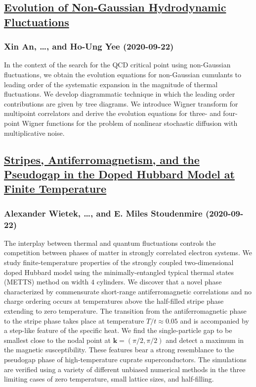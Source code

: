 {\subsection*{\href{http://arxiv.org/abs/2009.10742v1}{Evolution of Non-Gaussian Hydrodynamic Fluctuations}}
\subsubsection*{Xin An, \dots, and Ho-Ung Yee (2020-09-22)}
In the context of the search for the QCD critical point using non-Gaussian
fluctuations, we obtain the evolution equations for non-Gaussian cumulants to
leading order of the systematic expansion in the magnitude of thermal
fluctuations. We develop diagrammatic technique in which the leading order
contributions are given by tree diagrams. We introduce Wigner transform for
multipoint correlators and derive the evolution equations for three- and
four-point Wigner functions for the problem of nonlinear stochastic diffusion
with multiplicative noise.

\subsection*{\href{http://arxiv.org/abs/2009.10736v1}{Stripes, Antiferromagnetism, and the Pseudogap in the Doped Hubbard  Model at Finite Temperature}}
\subsubsection*{Alexander Wietek, \dots, and E. Miles Stoudenmire (2020-09-22)}
The interplay between thermal and quantum fluctuations controls the
competition between phases of matter in strongly correlated electron systems.
We study finite-temperature properties of the strongly coupled two-dimensional
doped Hubbard model using the minimally-entangled typical thermal states
(METTS) method on width $4$ cylinders. We discover that a novel phase
characterized by commensurate short-range antiferromagnetic correlations and no
charge ordering occurs at temperatures above the half-filled stripe phase
extending to zero temperature. The transition from the antiferromagnetic phase
to the stripe phase takes place at temperature $T/t \approx 0.05$ and is
accompanied by a step-like feature of the specific heat. We find the
single-particle gap to be smallest close to the nodal point at
$\mathbf{k}=(\pi/2, \pi/2)$ and detect a maximum in the magnetic
susceptibility. These features bear a strong resemblance to the pseudogap phase
of high-temperature cuprate superconductors. The simulations are verified using
a variety of different unbiased numerical methods in the three limiting cases
of zero temperature, small lattice sizes, and half-filling.

}
